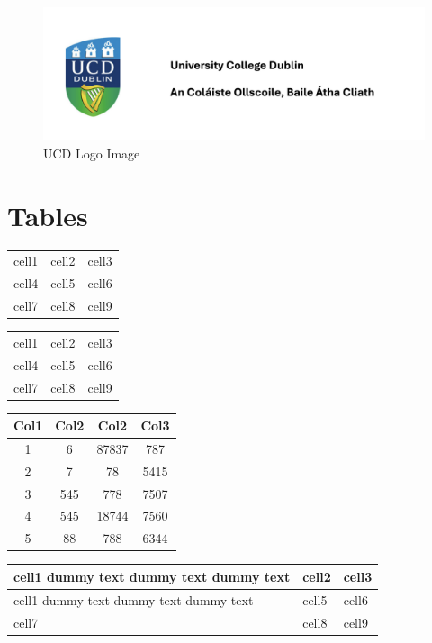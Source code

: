 \documentclass{article}
\begin{document}
\begin{figure}[ht]
    \includegraphics[width=\textwidth,left]{UCDLogo.png}
    \caption{UCD Logo Image}
    \label{fig:ucdlogo}
\end{figure}

\listoffigures

\section*{Tables}

\begin{center}
    \begin{tabular}{ c c c }
     cell1 & cell2 & cell3 \\ 
     cell4 & cell5 & cell6 \\  
     cell7 & cell8 & cell9    
    \end{tabular}
\end{center}

\begin{center}
    \begin{tabular}{ |c|c|c| } 
     \hline
     cell1 & cell2 & cell3 \\ 
     cell4 & cell5 & cell6 \\ 
     cell7 & cell8 & cell9 \\ 
     \hline
    \end{tabular}
\end{center}

\begin{center}
    \begin{tabular}{||c c c c||} 
     \hline
     Col1 & Col2 & Col2 & Col3 \\ [0.5ex] 
     \hline\hline
     1 & 6 & 87837 & 787 \\ 
     \hline
     2 & 7 & 78 & 5415 \\
     \hline
     3 & 545 & 778 & 7507 \\
     \hline
     4 & 545 & 18744 & 7560 \\
     \hline
     5 & 88 & 788 & 6344 \\ [1ex] 
     \hline
    \end{tabular}
\end{center}


\begin{center}
    \begin{tabular}{ | m{5em} | m{1cm}| m{1cm} | } 
    \hline
    cell1 dummy text dummy text dummy text& cell2 & cell3 \\ 
    \hline
    cell1 dummy text dummy text dummy text & cell5 & cell6 \\ 
    \hline
    cell7 & cell8 & cell9 \\ 
    \hline
    \end{tabular}
\end{center}
\end{document}
